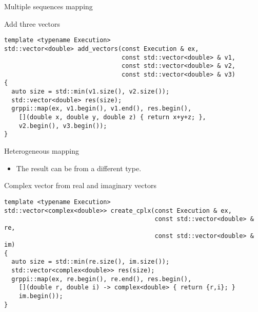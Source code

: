 \begin{frame}[t,fragile]{Multiple sequences mapping}
\begin{block}{Add three vectors}
\begin{lstlisting}
template <typename Execution>
std::vector<double> add_vectors(const Execution & ex, 
                                const std::vector<double> & v1,
                                const std::vector<double> & v2,
                                const std::vector<double> & v3) 
{
  auto size = std::min(v1.size(), v2.size());
  std::vector<double> res(size);
  grppi::map(ex, v1.begin(), v1.end(), res.begin(),
    [](double x, double y, double z) { return x+y+z; },
    v2.begin(), v3.begin());
}
\end{lstlisting}
\end{block}
\end{frame}

\begin{frame}[t,fragile]{Heterogeneous mapping}
\begin{itemize}
  \item The result can be from a different type.
\end{itemize}
\begin{block}{Complex vector from real and imaginary vectors}
\begin{lstlisting}
template <typename Execution>
std::vector<complex<double>> create_cplx(const Execution & ex,
                                         const std::vector<double> & re,
                                         const std::vector<double> & im)
{
  auto size = std::min(re.size(), im.size());
  std::vector<complex<double>> res(size);
  grppi::map(ex, re.begin(), re.end(), res.begin(),
    [](double r, double i) -> complex<double> { return {r,i}; }
    im.begin());
}
\end{lstlisting}
\end{block}
\end{frame}
